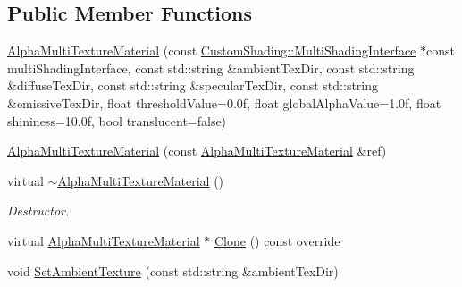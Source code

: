 \subsection*{Public Member Functions}
\begin{DoxyCompactItemize}
\item 
\mbox{\hyperlink{class_geometry_engine_1_1_geometry_material_1_1_alpha_multi_texture_material_afbe5ecfee4a6078c9c6f1a92e430e27e}{Alpha\+Multi\+Texture\+Material}} (const \mbox{\hyperlink{class_geometry_engine_1_1_custom_shading_1_1_multi_shading_interface}{Custom\+Shading\+::\+Multi\+Shading\+Interface}} $\ast$const multi\+Shading\+Interface, const std\+::string \&ambient\+Tex\+Dir, const std\+::string \&diffuse\+Tex\+Dir, const std\+::string \&specular\+Tex\+Dir, const std\+::string \&emissive\+Tex\+Dir, float threshold\+Value=0.\+0f, float global\+Alpha\+Value=1.\+0f, float shininess=10.\+0f, bool translucent=false)
\item 
\mbox{\hyperlink{class_geometry_engine_1_1_geometry_material_1_1_alpha_multi_texture_material_a1da236db5dcd0965111e3330fc276668}{Alpha\+Multi\+Texture\+Material}} (const \mbox{\hyperlink{class_geometry_engine_1_1_geometry_material_1_1_alpha_multi_texture_material}{Alpha\+Multi\+Texture\+Material}} \&ref)
\item 
\mbox{\label{class_geometry_engine_1_1_geometry_material_1_1_alpha_multi_texture_material_a8a01c763c71d82a427ef87cdb7a535b6}} 
virtual \mbox{\hyperlink{class_geometry_engine_1_1_geometry_material_1_1_alpha_multi_texture_material_a8a01c763c71d82a427ef87cdb7a535b6}{$\sim$\+Alpha\+Multi\+Texture\+Material}} ()
\begin{DoxyCompactList}\small\item\em Destructor. \end{DoxyCompactList}\item 
virtual \mbox{\hyperlink{class_geometry_engine_1_1_geometry_material_1_1_alpha_multi_texture_material}{Alpha\+Multi\+Texture\+Material}} $\ast$ \mbox{\hyperlink{class_geometry_engine_1_1_geometry_material_1_1_alpha_multi_texture_material_af31339a285fdf6180fe933f9c2f9ba16}{Clone}} () const override
\item 
void \mbox{\hyperlink{class_geometry_engine_1_1_geometry_material_1_1_alpha_multi_texture_material_afe947753d61d3d698d2b2f0dc755a63c}{Set\+Ambient\+Texture}} (const std\+::string \&ambient\+Tex\+Dir)
\item 

\end{DoxyCompactItemize}
